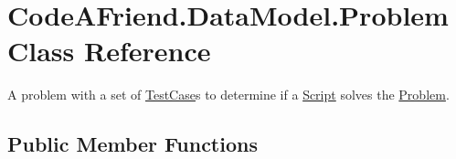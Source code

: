 \hypertarget{class_code_a_friend_1_1_data_model_1_1_problem}{}\section{Code\+A\+Friend.\+Data\+Model.\+Problem Class Reference}
\label{class_code_a_friend_1_1_data_model_1_1_problem}


A problem with a set of \mbox{\hyperlink{class_code_a_friend_1_1_data_model_1_1_test_case}{Test\+Case}}s to determine if a \mbox{\hyperlink{class_code_a_friend_1_1_data_model_1_1_script}{Script}} solves the \mbox{\hyperlink{class_code_a_friend_1_1_data_model_1_1_problem}{Problem}}.  


\subsection*{Public Member Functions}
